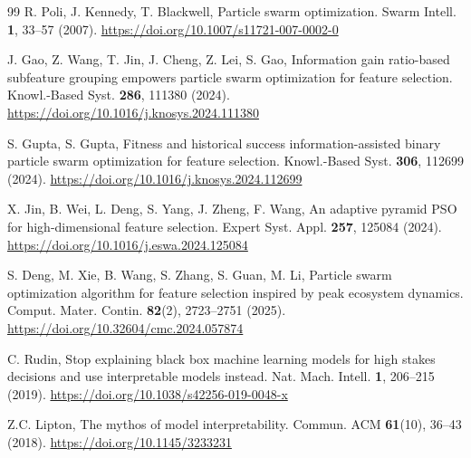 \documentclass[pdftex,sn-mathphys-num]{sn-jnl}
\begin{document}
\begin{thebibliography}{99}
 R. Poli, J. Kennedy, T. Blackwell, Particle swarm optimization. Swarm Intell. \textbf{1}, 33--57 (2007). \url{https://doi.org/10.1007/s11721-007-0002-0}

 J. Gao, Z. Wang, T. Jin, J. Cheng, Z. Lei, S. Gao, Information gain ratio-based subfeature grouping empowers particle swarm optimization for feature selection. Knowl.-Based Syst. \textbf{286}, 111380 (2024). \url{https://doi.org/10.1016/j.knosys.2024.111380}

 S. Gupta, S. Gupta, Fitness and historical success information-assisted binary particle swarm optimization for feature selection. Knowl.-Based Syst. \textbf{306}, 112699 (2024). \url{https://doi.org/10.1016/j.knosys.2024.112699}

 X. Jin, B. Wei, L. Deng, S. Yang, J. Zheng, F. Wang, An adaptive pyramid PSO for high-dimensional feature selection. Expert Syst. Appl. \textbf{257}, 125084 (2024). \url{https://doi.org/10.1016/j.eswa.2024.125084}

 S. Deng, M. Xie, B. Wang, S. Zhang, S. Guan, M. Li, Particle swarm optimization algorithm for feature selection inspired by peak ecosystem dynamics. Comput. Mater. Contin. \textbf{82}(2), 2723--2751 (2025). \url{https://doi.org/10.32604/cmc.2024.057874}

 C. Rudin, Stop explaining black box machine learning models for high stakes decisions and use interpretable models instead. Nat. Mach. Intell. \textbf{1}, 206--215 (2019). \url{https://doi.org/10.1038/s42256-019-0048-x}

 Z.C. Lipton, The mythos of model interpretability. Commun. ACM \textbf{61}(10), 36--43 (2018). \url{https://doi.org/10.1145/3233231}

\end{thebibliography}
\end{document}
